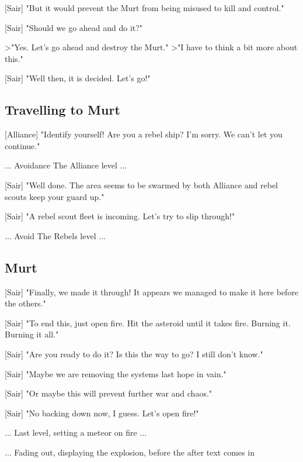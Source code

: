 \documentclass[a4paper,12pt]{article}
\begin{document}
[Sair] "But it would prevent the Murt from being misused to kill and control."

[Sair] "Should we go ahead and do it?"

\textgreater "Yes. Let's go ahead and destroy the Murt."
\textgreater "I have to think a bit more about this."

[Sair] "Well then, it is decided. Let's go!"

\subsection{Travelling to Murt}

[Alliance] "Identify yourself! Are you a rebel ship? I'm sorry. We can't let you continue."

... Avoidance The Alliance level ...

[Sair] "Well done. The area seems to be swarmed by both Alliance and rebel scouts keep your guard up."

[Sair] "A rebel scout fleet is incoming. Let's try to slip through!"

... Avoid The Rebels level ...

\subsection{Murt}

[Sair] "Finally, we made it through! It appears we managed to make it here before the others."

[Sair] "To end this, just open fire. Hit the asteroid until it takes fire. Burning it. Burning it all."

[Sair] "Are you ready to do it? Is this the way to go? I still don't know."

[Sair] "Maybe we are removing the systems last hope in vain."

[Sair] "Or maybe this will prevent further war and chaos."

[Sair] "No backing down now, I guess. Let's open fire!"

... Last level, setting a meteor on fire ...

... Fading out, displaying the explosion, before the after text comes in
\end{document}
